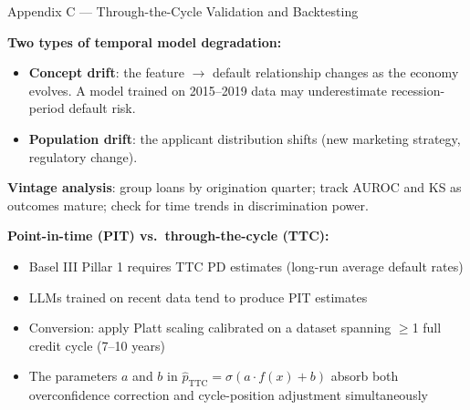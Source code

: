 \documentclass[9pt,t]{beamer}
\begin{document}
\begin{frame}[noframenumbering]{Appendix C --- Through-the-Cycle Validation and Backtesting}

\textbf{Two types of temporal model degradation:}
\begin{itemize}
  \item \textbf{Concept drift}: the feature $\to$ default relationship changes as the economy evolves. A model trained on 2015--2019 data may underestimate recession-period default risk.
  \item \textbf{Population drift}: the applicant distribution shifts (new marketing strategy, regulatory change).
\end{itemize}

\medskip
\textbf{Vintage analysis}: group loans by origination quarter; track AUROC and KS as
outcomes mature; check for time trends in discrimination power.

\medskip
\textbf{Point-in-time (PIT) vs.\ through-the-cycle (TTC):}
\begin{itemize}
  \item Basel III Pillar 1 requires TTC PD estimates (long-run average default rates)
  \item LLMs trained on recent data tend to produce PIT estimates
  \item Conversion: apply Platt scaling calibrated on a dataset spanning $\geq$1 full credit cycle (7--10 years)
  \item The parameters $a$ and $b$ in $\hat{p}_{\text{TTC}} = \sigma(a \cdot f(x) + b)$ absorb both overconfidence correction and cycle-position adjustment simultaneously
\end{itemize}
\end{frame}
\end{document}
